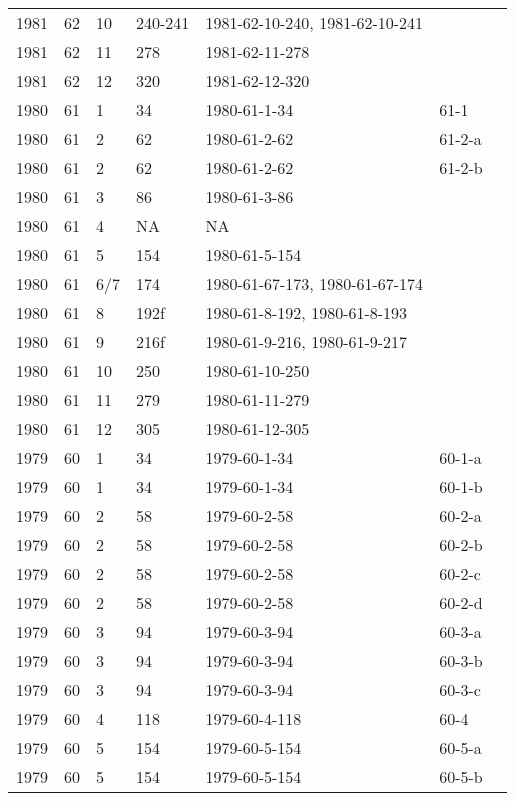 \begin{longtable}{ |l|l|l|l|p{2.7cm}|l|p{2cm}| }
 1981 & 62 &    10 & 240-241 & 1981-62-10-240, 1981-62-10-241 &  & \\
 1981 & 62 &    11 &     278 & 1981-62-11-278 &  & \\
 1981 & 62 &    12 &     320 & 1981-62-12-320 &  & \\
 1980 & 61 &     1 &      34 &   1980-61-1-34 & 61-1 & \\
 1980 & 61 &     2 &      62 &   1980-61-2-62 & 61-2-a & \\
 1980 & 61 &     2 &      62 &   1980-61-2-62 & 61-2-b & \\
 1980 & 61 &     3 &      86 &   1980-61-3-86 &  & \\
 1980 & 61 &     4 &      NA &    NA          &  & \\
 1980 & 61 &     5 &     154 & 1980-61-5-154  &  & \\
 1980 & 61 &   6/7 &     174 & 1980-61-67-173, 1980-61-67-174 &  & \\
 1980 & 61 &     8 &    192f & 1980-61-8-192, 1980-61-8-193 &  & \\
 1980 & 61 &     9 &    216f & 1980-61-9-216, 1980-61-9-217 &  & \\
 1980 & 61 &    10 &     250 & 1980-61-10-250 &  & \\
 1980 & 61 &    11 &     279 & 1980-61-11-279 &  & \\
 1980 & 61 &    12 &     305 & 1980-61-12-305 &  & \\
 1979 & 60 &     1 &      34 & 1979-60-1-34   & 60-1-a & \\
 1979 & 60 &     1 &      34 & 1979-60-1-34   & 60-1-b & \\
 1979 & 60 &     2 &      58 & 1979-60-2-58   & 60-2-a & \\
 1979 & 60 &     2 &      58 & 1979-60-2-58   & 60-2-b & \\
 1979 & 60 &     2 &      58 & 1979-60-2-58   & 60-2-c & \\
 1979 & 60 &     2 &      58 & 1979-60-2-58   & 60-2-d & \\
 1979 & 60 &     3 &      94 & 1979-60-3-94   & 60-3-a & \\
 1979 & 60 &     3 &      94 & 1979-60-3-94   & 60-3-b & \\
 1979 & 60 &     3 &      94 & 1979-60-3-94   & 60-3-c & \\
 1979 & 60 &     4 &     118 & 1979-60-4-118  & 60-4 & \\
 1979 & 60 &     5 &     154 & 1979-60-5-154  & 60-5-a & \\
 1979 & 60 &     5 &     154 & 1979-60-5-154  & 60-5-b & \\

\end{longtable}
